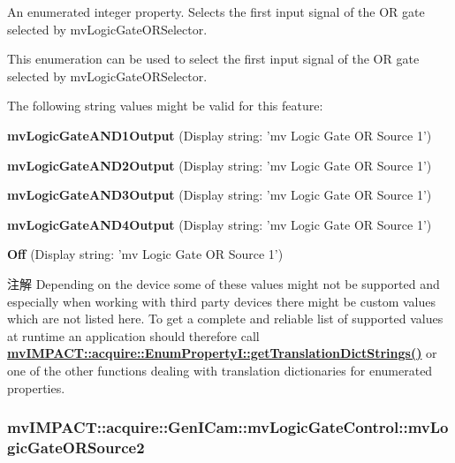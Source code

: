 An enumerated integer property. Selects the first input signal of the O\+R gate selected by mv\+Logic\+Gate\+O\+R\+Selector. 

This enumeration can be used to select the first input signal of the O\+R gate selected by mv\+Logic\+Gate\+O\+R\+Selector.

The following string values might be valid for this feature\+:
\begin{DoxyItemize}
\item {\bfseries mv\+Logic\+Gate\+A\+N\+D1\+Output} (Display string\+: 'mv Logic Gate O\+R Source 1')
\item {\bfseries mv\+Logic\+Gate\+A\+N\+D2\+Output} (Display string\+: 'mv Logic Gate O\+R Source 1')
\item {\bfseries mv\+Logic\+Gate\+A\+N\+D3\+Output} (Display string\+: 'mv Logic Gate O\+R Source 1')
\item {\bfseries mv\+Logic\+Gate\+A\+N\+D4\+Output} (Display string\+: 'mv Logic Gate O\+R Source 1')
\item {\bfseries Off} (Display string\+: 'mv Logic Gate O\+R Source 1')
\end{DoxyItemize}

\begin{DoxyNote}{注解}
Depending on the device some of these values might not be supported and especially when working with third party devices there might be custom values which are not listed here. To get a complete and reliable list of supported values at runtime an application should therefore call {\bfseries \hyperlink{classmv_i_m_p_a_c_t_1_1acquire_1_1_enum_property_i_a0ba6ccbf5ee69784d5d0b537924d26b6}{mv\+I\+M\+P\+A\+C\+T\+::acquire\+::\+Enum\+Property\+I\+::get\+Translation\+Dict\+Strings()}} or one of the other functions dealing with translation dictionaries for enumerated properties. 
\end{DoxyNote}
\hypertarget{classmv_i_m_p_a_c_t_1_1acquire_1_1_gen_i_cam_1_1mv_logic_gate_control_a353a54d135685ff6a49fcdf63cf8a1eb}{
\subsubsection[{mv\+Logic\+Gate\+O\+R\+Source2}]{ mv\+I\+M\+P\+A\+C\+T\+::acquire\+::\+Gen\+I\+Cam\+::mv\+Logic\+Gate\+Control\+::mv\+Logic\+Gate\+O\+R\+Source2}}\label{classmv_i_m_p_a_c_t_1_1acquire_1_1_gen_i_cam_1_1mv_logic_gate_control_a353a54d135685ff6a49fcdf63cf8a1eb}


